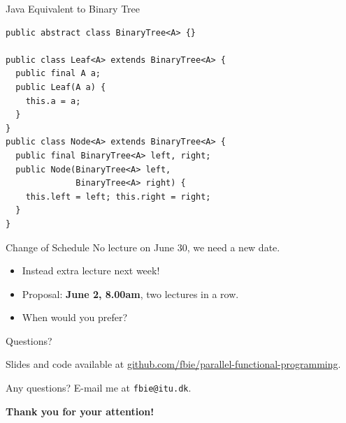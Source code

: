 \documentclass{beamer}
\begin{document}
\begin{frame}[fragile]{Java Equivalent to Binary Tree}
\begin{lstlisting}[style=Java]
public abstract class BinaryTree<A> {}

public class Leaf<A> extends BinaryTree<A> {
  public final A a;
  public Leaf(A a) {
    this.a = a;
  }
}
public class Node<A> extends BinaryTree<A> {
  public final BinaryTree<A> left, right;
  public Node(BinaryTree<A> left,
              BinaryTree<A> right) {
    this.left = left; this.right = right;
  }
}
\end{lstlisting}
\end{frame}

\begin{frame}{Change of Schedule}
  No lecture on June 30, we need a new date.

  \vspace{1.5cm}

  \begin{itemize}
  \item Instead extra lecture next week!
  \pause{} \item Proposal: \textbf{June 2, 8.00am}, two lectures in a row.
  \pause{} \item When would you prefer?
  \end{itemize}

\end{frame}

\begin{frame}{Questions?}

  \begin{center}
    Slides and code available at \url{github.com/fbie/parallel-functional-programming}.
  \end{center}

  \pause{}

  \begin{center}
    Any questions? E-mail me at \texttt{fbie@itu.dk}.
  \end{center}

  \pause{}

  \begin{center}
    \textbf{Thank you for your attention!}
  \end{center}

\end{frame}
\end{document}
